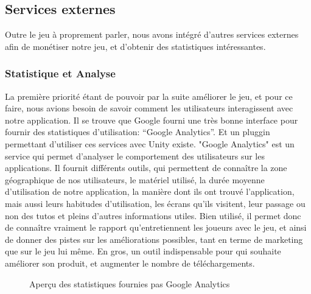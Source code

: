 \subsection{Services externes}
Outre le jeu à proprement parler, nous avons intégré d'autres services externes afin de monétiser notre jeu, et d'obtenir des statistiques intéressantes.

\subsubsection{Statistique et Analyse}

La première priorité étant de pouvoir par la suite améliorer le jeu, et pour ce faire, nous avions besoin de savoir comment les utilisateurs interagissent avec notre application. Il se trouve que Google fourni une très bonne interface pour fournir des statistiques d'utilisation: “Google Analytics”. Et un pluggin permettant d'utiliser ces services avec Unity existe. "Google Analytics" est un service qui permet d'analyser le comportement des utilisateurs sur les applications. Il fournit différents outils, qui permettent de connaître la zone géographique de nos utilisateurs, le matériel utilisé, la durée moyenne d'utilisation de notre application, la manière dont ils ont trouvé l'application, mais aussi leurs habitudes d'utilisation, les écrans qu'ils visitent, leur passage ou non des tutos et pleins d'autres informations utiles. Bien utilisé, il permet donc de connaître vraiment le rapport qu'entretiennent les joueurs avec le jeu, et ainsi de donner des pistes sur les améliorations possibles, tant en terme de marketing que sur le jeu lui même. En gros, un outil indispensable pour qui souhaite améliorer son produit, et augmenter le nombre de téléchargements.

\begin{figure}[H]\centering
  \caption{Aperçu des statistiques fournies pas Google Analytics}
  \label{analytics}
\end{figure}

